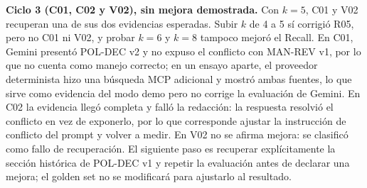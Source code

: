 \documentclass[11pt,a4paper]{article}
\begin{document}
\textbf{Ciclo 3 (C01, C02 y V02), sin mejora demostrada.} Con $k=5$, C01 y V02 recuperan una de sus dos evidencias esperadas. Subir $k$ de 4 a 5 sí corrigió R05, pero no C01 ni V02, y probar $k=6$ y $k=8$ tampoco mejoró el Recall. En C01, Gemini presentó POL-DEC v2 y no expuso el conflicto con MAN-REV v1, por lo que no cuenta como manejo correcto; en un ensayo aparte, el proveedor determinista hizo una búsqueda MCP adicional y mostró ambas fuentes, lo que sirve como evidencia del modo demo pero no corrige la evaluación de Gemini. En C02 la evidencia llegó completa y falló la redacción: la respuesta resolvió el conflicto en vez de exponerlo, por lo que corresponde ajustar la instrucción de conflicto del prompt y volver a medir. En V02 no se afirma mejora: se clasificó como fallo de recuperación. El siguiente paso es recuperar explícitamente la sección histórica de POL-DEC v1 y repetir la evaluación antes de declarar una mejora; el golden set no se modificará para ajustarlo al resultado.

\end{document}
